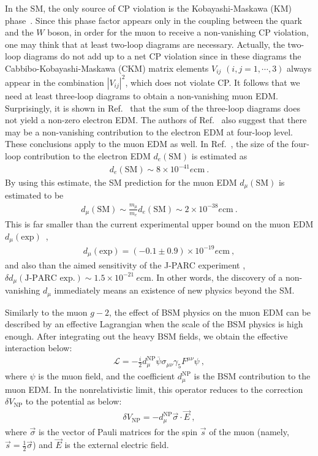 In the SM, the only source of CP violation is
the Kobayashi-Maskawa (KM) phase~\cite{Kobayashi:1973fv}.
Since this phase factor appears only in the coupling between
the quark and the $W$ boson, in order for the muon to receive a 
non-vanishing CP violation, one may think that at least
two-loop diagrams are necessary.  Actually, the two-loop
diagrams do not add up to a net CP violation since in these
diagrams the Cabbibo-Kobayashi-Maskawa (CKM) matrix elements $V_{ij}$
$(i,j= 1,\cdots, 3)$ always appear in the combination $|V_{ij}|^2$,
which does not violate CP.  It follows that we need
at least three-loop diagrams to obtain a non-vanishing muon EDM.  
Surprisingly, it is shown in Ref.~\cite{Pospelov:1991zt} that
the sum of the three-loop diagrams does not yield a non-zero
electron EDM.  The authors of Ref.~\cite{Pospelov:1991zt}
also suggest that there may be a non-vanishing contribution
to the electron EDM at four-loop level.
These conclusions apply to the muon EDM as well.
In Ref.~\cite{Booth:1993af}, the size of the four-loop
contribution to the electron EDM $d_e(\text{SM})$ is estimated as 
%
\begin{align}
 d_e(\text{SM}) \sim 8 \times 10^{-41} e {\text{cm}}~.
\end{align}
%
By using this estimate, the SM prediction for
the muon EDM $d_\mu(\text{SM})$ is estimated to be
%
\begin{align}
 d_\mu(\text{SM}) \sim \frac{m_\mu}{m_e} d_e(\text{SM})
\sim 2 \times 10^{-38} e {\text{cm}}~.
\end{align}
%
This is far smaller than the current experimental 
upper bound on the muon EDM $d_\mu(\text{exp})$~\cite{Bennett:2008dy},
%
\begin{align}
 d_\mu(\text{exp}) = (-0.1\pm 0.9) \times 10^{-19}  e {\text{cm}}~,
\end{align}
%
and also than the aimed sensitivity of the J-PARC 
experiment \cite{TDRsummarypaper}, 
$\delta d_\mu(\text{J-PARC exp.}) \sim 1.5 
\times 10^{-21} ~ e {\text{cm}}$.   In other words,
the discovery of a non-vanishing $d_\mu$ immediately
means an existence of new physics beyond the SM.

Similarly to the muon $g-2$, the effect of BSM physics
on the muon EDM can be described by an effective
Lagrangian when the scale of the BSM physics is high enough.
After integrating out the heavy BSM fields,
we obtain the effective interaction below:
%
\begin{align}
 {\mathcal L} = - \frac{i}{2} d_\mu^{\text{NP}}
 \overline{\psi} \sigma_{\mu\nu} \gamma_5 F^{\mu\nu} \psi ~,
\label{eq:effL_EDM}
\end{align}
%
where $\psi$ is the muon field, and the coefficient
$d_\mu^{\text{NP}}$ is the BSM contribution to the muon EDM.
In the nonrelativistic limit, this operator reduces to the
correction $\delta V_{\text{NP}}$ to the potential as below:
%
\begin{align}
 \delta V_{\text{NP}} 
  = - d_\mu^{\text{NP}} \vec{\sigma} \cdot \vec{E}~,
\end{align}
%
where $\vec{\sigma}$ is the vector of Pauli matrices
for the spin $\vec{s}$ of the muon (namely, 
$\vec{s}= \frac12 \vec{\sigma}$) and $\vec{E}$ is
the external electric field. 


